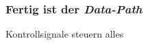 \documentclass[t,aspectratio=169,usenames,dvipsnames]{beamer}
\begin{document}
\begin{frame}
  \frametitle{Fertig ist der \emph{Data-Path}}

  \strut{} Kontrollsignale steuern alles

  \begin{center}
  \end{center}
\end{frame}
\end{document}

